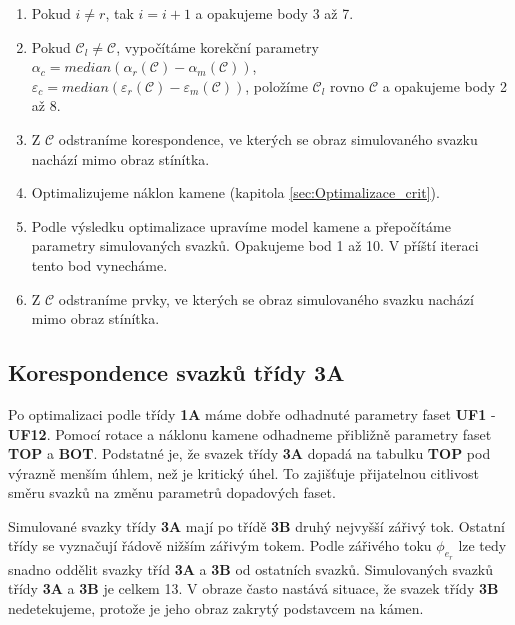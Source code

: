 \begin{enumerate}
\item Pokud $i \neq r$, tak $i = i+1$ a opakujeme body 3 až 7.

\item Pokud $\mathcal{C}_{l} \neq \mathcal{C}$, vypočítáme korekční parametry $\alpha_{c} = median(\alpha_{r}(\mathcal{C})-\alpha_{m}(\mathcal{C}))$, \\ $\varepsilon_{c} = median(\varepsilon_{r}(\mathcal{C})-\varepsilon_{m}(\mathcal{C}))$, položíme $\mathcal{C}_{l}$ rovno $\mathcal{C}$  a opakujeme body 2 až 8.

\item Z $\mathcal{C}$ odstraníme korespondence, ve kterých se obraz simulovaného svazku nachází mimo obraz stínítka.

\item Optimalizujeme náklon kamene (kapitola \ref{sec:Optimalizace_crit}).

\item Podle výsledku optimalizace upravíme model kamene a přepočítáme parametry simulovaných svazků. Opakujeme bod 1 až 10. V příští iteraci tento bod vynecháme. 

\item Z $\mathcal{C}$ odstraníme prvky, ve kterých se obraz simulovaného svazku nachází mimo obraz stínítka.

\end{enumerate}
\newpage
\subsection{Korespondence svazků třídy \textbf{3A}}	
\label{sec:3A}
	Po optimalizaci podle třídy \textbf{1A} máme dobře odhadnuté parametry faset \textbf{UF1} - \textbf{UF12}. Pomocí rotace a náklonu kamene odhadneme přibližně parametry faset \textbf{TOP} a \textbf{BOT}. Podstatné je, že svazek třídy \textbf{3A} dopadá na tabulku \textbf{TOP} pod výrazně menším úhlem, než je kritický úhel. To zajišťuje přijatelnou citlivost směru svazků na změnu parametrů dopadových faset. 
	
	Simulované svazky třídy \textbf{3A} mají po třídě \textbf{3B} druhý nejvyšší zářivý tok. Ostatní třídy se vyznačují řádově nižším zářivým tokem. Podle zářivého toku $\phi_{e_r}$ lze tedy snadno oddělit svazky tříd \textbf{3A} a \textbf{3B} od ostatních svazků. Simulovaných svazků třídy \textbf{3A} a \textbf{3B} je celkem 13. V obraze často nastává situace, že svazek třídy \textbf{3B} nedetekujeme, protože je jeho obraz zakrytý podstavcem na kámen.
	
